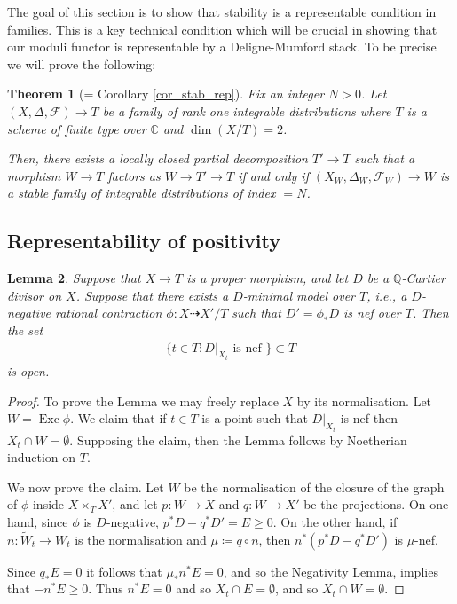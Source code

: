 \documentclass[12pt, a4paper]{amsart}
\DeclareMathOperator{\exc}{Exc}
\newcounter{Theorem}
\newtheorem{theorem}{Theorem}[section]
\newtheorem{lemma}[theorem]{Lemma}
\theoremstyle{definition}
\theoremstyle{named}
\begin{document}
The goal of this section is to show that stability is a representable condition
in families.  This is a key technical condition which will be crucial in showing that our moduli functor is representable by a Deligne-Mumford stack.
To be precise we will prove the following:

\begin{theorem}[= Corollary \ref{cor_stab_rep}]
Fix an integer $N>0$.  Let $(X, \Delta, \mathcal F) \rightarrow T$ be a family
    of rank one integrable distributions where $T$ is a scheme of finite type over $\mathbb C$ and $\dim (X/T) = 2$. 

    
    Then, there exists a locally closed partial decomposition $T' \rightarrow T$ such that 
    a morphism $W \rightarrow T$ factors as $W \rightarrow T' \rightarrow T$
    if and only if $(X_W, \Delta_W, \mathcal F_W) \rightarrow W$ is a stable family of integrable distributions of index $=N$.
\end{theorem}



\subsection{Representability of positivity}



\begin{lemma}
\label{lem_mmp_implies_nef_open}
    Suppose that $X \rightarrow T$ is a proper morphism, and let $D$ be a $\mathbb Q$-Cartier divisor on $X$. Suppose that there exists a  $D$-minimal model over $T$, i.e., a $D$-negative rational contraction $\phi\colon X \dashrightarrow X'/T$ such that $D' = \phi_*D$ is nef over $T$.
    Then the set 
    \begin{align*}\{t \in T: D\vert_{X_t} \text{ is nef }\} \subset T\end{align*} is open.\end{lemma}
    \begin{proof}
   To prove the Lemma we may freely replace $X$ by its normalisation.   
        Let $W = \exc \phi$.  We claim that if $t \in T$ is a point such that $D\vert_{X_t}$ is nef then 
        $X_t \cap W = \emptyset$.  Supposing the claim, then the Lemma follows by Noetherian induction on $T$.

        We now prove the claim. Let $W$ be the normalisation of the closure of the graph of $\phi$ inside $X \times_T X'$, and let $p\colon W \rightarrow X$ and $q\colon W \rightarrow X'$ be the projections.  On one hand,  since $\phi$ is $D$-negative, $p^*D-q^*D' = E \ge 0$.  On the other hand, if $n\colon \tilde{W}_t \rightarrow W_t$ is the normalisation and $\mu\coloneqq q\circ n$, then $n^*(p^*D-q^*D')$ is $\mu$-nef.

        Since $q_*E = 0$ it follows that $\mu_*n^*E = 0$, 
        and so the Negativity Lemma, \cite[Lemma 3.39]{KM98} implies that $-n^*E \ge 0$.
        Thus $n^*E = 0$ and so $X_t \cap E = \emptyset$, and so $X_t \cap W = \emptyset$.
    \end{proof}
\end{document}
